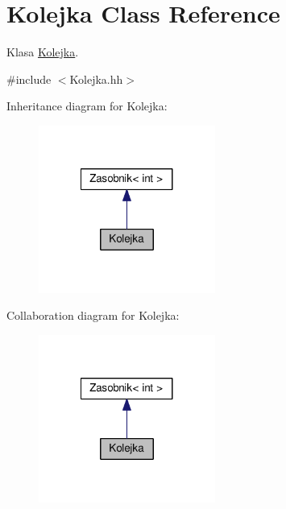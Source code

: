 \hypertarget{a00013}{}\section{Kolejka Class Reference}
\label{a00013}


Klasa \hyperlink{a00013}{Kolejka}.  




{\ttfamily \#include $<$Kolejka.\+hh$>$}



Inheritance diagram for Kolejka\+:
\nopagebreak
\begin{figure}[H]
\begin{center}
\leavevmode
\includegraphics[width=164pt]{a00151}
\end{center}
\end{figure}


Collaboration diagram for Kolejka\+:
\nopagebreak
\begin{figure}[H]
\begin{center}
\leavevmode
\includegraphics[width=164pt]{a00152}
\end{center}
\end{figure}
